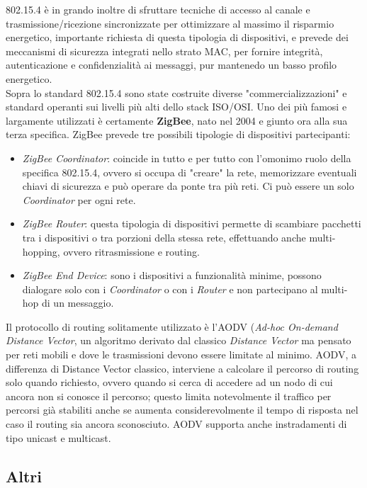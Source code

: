 802.15.4 è in grando inoltre di sfruttare tecniche di accesso al canale e trasmissione/ricezione sincronizzate per ottimizzare al massimo il risparmio energetico, importante richiesta di questa tipologia di dispositivi, e prevede dei meccanismi di sicurezza integrati nello strato MAC, per fornire integrità, autenticazione e confidenzialità ai messaggi, pur mantenedo un basso profilo energetico.
\vspace{1.0cm}
\\Sopra lo standard 802.15.4 sono state costruite diverse "commercializzazioni" e standard operanti sui livelli più alti dello stack ISO/OSI. Uno dei più famosi e largamente utilizzati è certamente \textbf{ZigBee}, nato nel 2004 e giunto ora alla sua terza specifica. ZigBee prevede tre possibili tipologie di dispositivi partecipanti:
\begin{itemize}
\item \textit{ZigBee Coordinator}: coincide in tutto e per tutto con l'omonimo ruolo della specifica 802.15.4, ovvero si occupa di "creare" la rete, memorizzare eventuali chiavi di sicurezza e può operare da ponte tra più reti. Ci può essere un solo \textit{Coordinator} per ogni rete.
\item \textit{ZigBee Router}: questa tipologia di dispositivi permette di scambiare pacchetti tra i dispositivi o tra porzioni della stessa rete, effettuando anche multi-hopping, ovvero ritrasmissione e routing.
\item \textit{ZigBee End Device}: sono i dispositivi a funzionalità minime, possono dialogare solo con i \textit{Coordinator} o con i \textit{Router} e non partecipano al multi-hop di un messaggio.
\end{itemize}
Il protocollo di routing solitamente utilizzato è l'AODV (\textit{Ad-hoc On-demand Distance Vector}, un algoritmo derivato dal classico \textit{Distance Vector} ma pensato per reti mobili e dove le trasmissioni devono essere limitate al minimo. AODV, a differenza di Distance Vector classico, interviene a calcolare il percorso di routing solo quando richiesto, ovvero quando si cerca di accedere ad un nodo di cui ancora non si conosce il percorso; questo limita notevolmente il traffico per percorsi già stabiliti anche se aumenta considerevolmente il tempo di risposta nel caso il routing sia ancora sconosciuto. AODV supporta anche instradamenti di tipo unicast e multicast.

\subsection{Altri}

